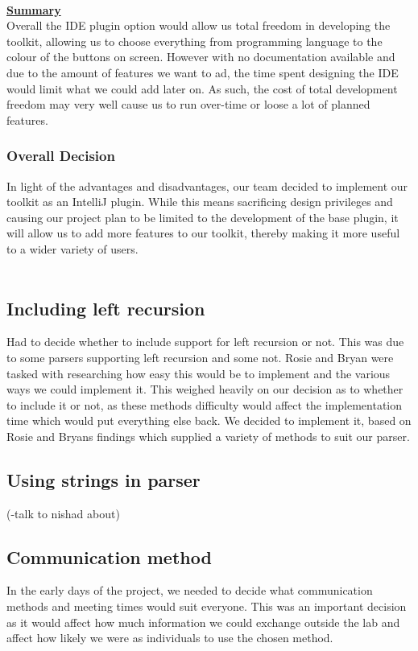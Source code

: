 \documentclass{l3proj}
\begin{document}
\\
\textbf {\underline{Summary}}\\
 Overall the IDE plugin option would allow us total freedom in developing the toolkit, allowing us to choose everything from programming language to the colour of the buttons on screen. However with no documentation available and due to the amount of features we want to ad, the time spent designing the IDE would limit what we could add later on. As such, the cost of total development freedom may very well cause us to run over-time or loose a lot of planned features.

\subsubsection{Overall Decision}
In light of the advantages and disadvantages, our team decided to implement our toolkit as an IntelliJ plugin. While this means sacrificing design privileges and causing our project plan to be limited to the development of the base plugin, it will allow us to add more features to our toolkit, thereby making it more useful to a wider variety of users.\\
\\ 

\subsection{Including left recursion}
Had to decide whether to include support for left recursion or not. This was due to some parsers supporting left recursion and some not. Rosie and Bryan were tasked with researching how easy this would be to implement and the various ways we could implement it. This weighed heavily on our decision as to whether to include it or not, as these methods difficulty would affect the implementation time which would put everything else back. We decided to implement it, based on Rosie and Bryans findings which supplied a variety of methods to suit our parser.




\subsection{Using strings in parser}
(-talk to nishad about) %


\subsection{Communication method}
In the early days of the project, we needed to decide what communication methods and meeting times would suit everyone. This was an important decision as it would affect how much information we could exchange outside the lab and affect how likely we were as individuals to use the chosen method.\\
\\
\end{document}
